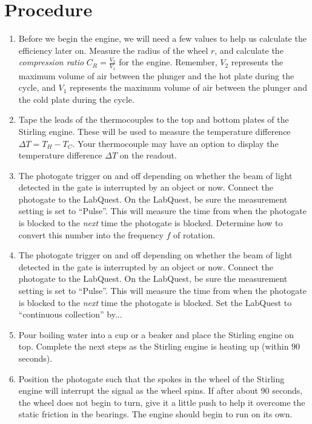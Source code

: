 \documentclass{article}
\begin{document}
\section{Procedure}
\begin{enumerate}
    \item Before we begin the engine, we will need a few values to help us calculate the efficiency later on. Measure the radius of the wheel $r$, and calculate the \textit{compression ratio} $C_R = \frac{V_2}{V_1}$ for the engine. Remember, $V_2$ represents the maximum volume of air between the plunger and the hot plate during the cycle, and $V_1$ represents the maximum volume of air between the plunger and the cold plate during the cycle.
    \item Tape the leads of the thermocouples to the top and bottom plates of the Stirling engine. These will be used to measure the temperature difference $\Delta T = T_H - T_C$. Your thermocouple may have an option to display the temperature difference $\Delta T$ on the readout.
    \item The photogate trigger on and off depending on whether the beam of light detected in the gate is interrupted by an object or now. Connect the photogate to the LabQuest. On the LabQuest, be sure the measurement setting is set to ``Pulse''. This will measure the time from when the photogate is blocked to the \textit{next} time the photogate is blocked. Determine how to convert this number into the frequency $f$ of rotation.
    \item The photogate trigger on and off depending on whether the beam of light detected in the gate is interrupted by an object or now. Connect the photogate to the LabQuest. On the LabQuest, be sure the measurement setting is set to ``Pulse''. This will measure the time from when the photogate is blocked to the \textit{next} time the photogate is blocked. Set the LabQuest to ``continuous collection'' by...
    \item Pour boiling water into a cup or a beaker and place the Stirling engine on top. Complete the next steps as the Stirling engine is heating up (within $90$ seconds).
    \item Position the photogate such that the spokes in the wheel of the Stirling engine will interrupt the signal as the wheel spins. If after about 90 seconds, the wheel does not begin to turn, give it a little push to help it overcome the static friction in the bearings. The engine should begin to run on its own.
\end{enumerate}
\end{document}
